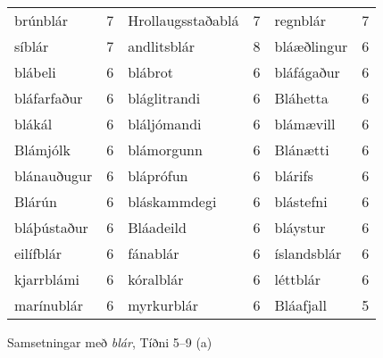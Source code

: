 \documentclass[../samsetningasafn.tex]{subfiles}
\begin{document}
\begin{wordlist}[H]
\begin{tcolorbox}
\begin{tabular}{BlBlBl}
		brúnblár			& 7		& 	
		Hrollaugsstaðablá & 7	& 	
		regnblár			& 7		\\ 	%
		síblár			& 7		& 		
		andlitsblár		& 8		& 	
		bláæðlingur		& 6		\\ 	%
		blábeli			& 6		& 	
		blábrot			& 6		& 	
		bláfágaður		& 6		\\ 	 %
		bláfarfaður		& 6		& 	
		bláglitrandi		& 6		& 
		Bláhetta			& 6		\\ 	%
		blákál			& 6		& 	
		bláljómandi		& 6		& 
		blámævill		& 6		\\ 	%
		Blámjólk			& 6		& 	
		blámorgunn		& 6		& 
		Blánætti			& 6		\\ 	%
		blánauðugur		& 6		& 	
		bláprófun		& 6		& 	
		blárifs			& 6		\\ 	 %
		Blárún			& 6		& 	
		bláskammdegi	& 6		& 	
		blástefni			& 6		\\  %
		bláþústaður		& 6		& 
		Bláadeild		& 6		& 	
		bláystur			& 6		\\ 	%
		eilífblár			& 6		& 
		fánablár			& 6		& 
		íslandsblár		& 6		\\  %
		kjarrblámi		& 6		& 	
		kóralblár		& 6		& 	
		léttblár			& 6		\\ 	%
		marínublár		& 6		& 	
		myrkurblár		& 6		& 	
		Bláafjall			& 5		  %
	\end{tabular}

\end{tcolorbox}
	\caption{Samsetningar með \textit{blár}, Tíðni 5--9 (a)}
	\label{listi:blatt.5a}
\end{wordlist}
		
\end{document}
